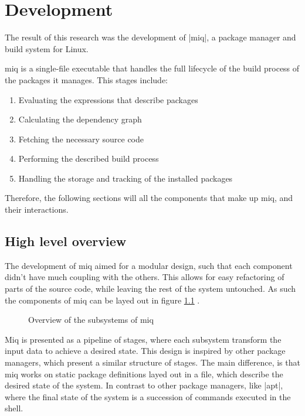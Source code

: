 \chapter{Development}

The result of this research was the development of |miq|, a package manager and
build system for Linux.

miq is a single-file executable that handles the full lifecycle of the build
process of the packages it manages. This stages include:

\begin{enumerate}
    \item Evaluating the expressions that describe packages
    \item Calculating the dependency graph
    \item Fetching the necessary source code
    \item Performing the described build process
    \item Handling the storage and tracking of the installed packages
\end{enumerate}

Therefore, the following sections will all the components that make up miq, and
their interactions.

\section{High level overview}

The development of miq aimed for a modular design, such that
each component didn't have much coupling with the others.
This allows for easy refactoring of parts of the source
code, while leaving the rest of the system untouched. As
such the components of miq can be layed out in figure
\ref{fig:miq-components} .

\begin{figure}[hbtp]
    \centerfloat
    
    \caption{Overview of the subsystems of miq}
    \label{fig:miq-components}
\end{figure}

Miq is presented as a pipeline of stages, where each
subsystem transform the input data to achieve a desired
state. This design is inspired by other package managers,
which present a similar structure of stages. The main
difference, is that miq works on static package definitions
layed out in a file, which describe the desired state of the
system. In contrast to other package managers, like |apt|,
where the final state of the system is a succession of
commands executed in the shell.

